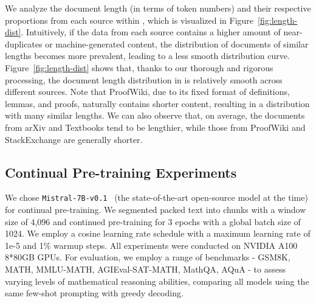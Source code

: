 We analyze the document length (in terms of token numbers) and their respective proportions from each source within \mathpile, which is visualized in Figure~\ref{fig:length-dist}. Intuitively, if the data from each source contains a higher amount of near-duplicates or machine-generated content, the distribution of documents of similar lengths becomes more prevalent, leading to a less smooth distribution curve. Figure~\ref{fig:length-dist} shows that, thanks to our thorough and rigorous processing, the document length distribution in \mathpile is relatively smooth across different sources. Note that ProofWiki, due to its fixed format of definitions, lemmas, and proofs, naturally contains shorter content, resulting in a distribution with many similar lengths. We can also observe that, on average, the documents from arXiv and Textbooks tend to be lengthier, while those from ProofWiki and StackExchange are generally shorter.

\subsection{Continual Pre-training Experiments}
\label{sec:continual-pretrain-exp}

We chose \texttt{Mistral-7B-v0.1}~\citep{DBLP:journals/corr/abs-2310-06825-mistral-7b} (the state-of-the-art open-source model at the time) for continual pre-training. We segmented packed text into chunks with a window size of 4,096 and continued pre-training for 3 epochs with a global batch size of 1024. We employ a cosine learning rate schedule with a maximum learning rate of 1e-5 and 1\% warmup steps. All experiments were conducted on NVIDIA A100 8*80GB GPUs. For evaluation, we employ a range of benchmarks - GSM8K, MATH, MMLU-MATH, AGIEval-SAT-MATH, MathQA, AQuA - to assess varying levels of mathematical reasoning abilities, comparing all models using the same few-shot prompting with greedy decoding.

